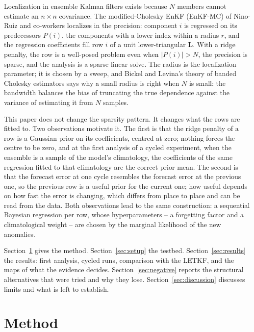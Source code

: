 \documentclass[11pt]{article}
\newcommand{\Lm}{\mathbf{L}}
\begin{document}
Localization in ensemble Kalman filters exists because $N$ members cannot estimate an
$n\times n$ covariance. The modified-Cholesky EnKF (EnKF-MC) of Nino-Ruiz and
co-workers localizes in the precision: component $i$ is regressed on its predecessors
$P(i)$, the components with a lower index within a radius $r$, and the regression
coefficients fill row $i$ of a unit lower-triangular $\Lm$. With a ridge penalty, the
row is a well-posed problem even when $|P(i)|>N$, the precision is sparse, and the
analysis is a sparse linear solve. The radius is the localization parameter; it is
chosen by a sweep, and Bickel and Levina's theory of banded Cholesky estimators says
why a small radius is right when $N$ is small: the bandwidth balances the bias of
truncating the true dependence against the variance of estimating it from $N$ samples.

This paper does not change the sparsity pattern. It changes what the rows are fitted
to. Two observations motivate it. The first is that the ridge penalty of a row is a
Gaussian prior on its coefficients, centred at zero; nothing forces the centre to be
zero, and at the first analysis of a cycled experiment, when the ensemble is a sample
of the model's climatology, the coefficients of the same regression fitted to that
climatology are the correct prior mean. The second is that the forecast error at one
cycle resembles the forecast error at the previous one, so the previous row is a
useful prior for the current one; how useful depends on how fast the error is changing,
which differs from place to place and can be read from the data. Both observations
lead to the same construction: a sequential Bayesian regression per row, whose
hyperparameters -- a forgetting factor and a climatological weight -- are chosen by
the marginal likelihood of the new anomalies.

Section~\ref{sec:method} gives the method. Section~\ref{sec:setup} the testbed.
Section~\ref{sec:results} the results: first analysis, cycled runs, comparison with
the LETKF, and the maps of what the evidence decides. Section~\ref{sec:negative}
reports the structural alternatives that were tried and why they lose.
Section~\ref{sec:discussion} discusses limits and what is left to establish.

\section{Method}\label{sec:method}
\end{document}
